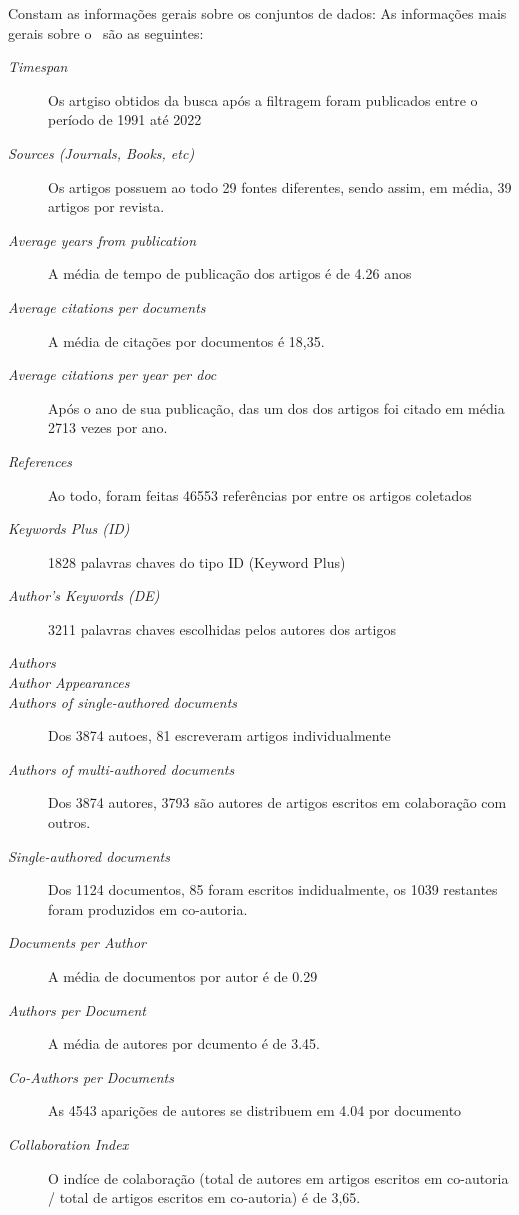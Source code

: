Constam as informações gerais sobre os conjuntos de dados:
As informações mais gerais sobre o \dataset\   são as seguintes:
\begin{description}
    \item [\textit{Timespan}] Os artgiso obtidos da busca após a filtragem foram publicados entre o período de 1991 até 2022
    \item [\textit{Sources (Journals, Books, etc)}] Os artigos possuem ao todo 29 fontes diferentes, sendo assim, em média, 39 artigos por revista.
    \item [\textit{Average years from publication}] A média de tempo de publicação dos artigos é de 4.26 anos
    \item [\textit{Average citations per documents}] A média de citações por documentos é 18,35.
    \item [\textit{Average citations per year per doc}] Após o ano de sua publicação, das um dos dos artigos foi citado em média 2713 vezes por ano.
    \item [\textit{References}] Ao todo, foram feitas 46553  referências por entre os artigos coletados
    \item [\textit{Keywords Plus (ID)}] 1828 palavras chaves do tipo ID (Keyword Plus)
    \item [\textit{Author's Keywords (DE)}]  3211 palavras chaves escolhidas pelos autores dos artigos

    \item [\textit{Authors}]  
    \item [\textit{Author Appearances}] 
    \item [\textit{Authors of single-authored documents}] Dos 3874 autoes, 81 escreveram artigos individualmente
    \item [\textit{Authors of multi-authored documents}] Dos 3874 autores, 3793 são autores de artigos escritos em colaboração com outros.
    \item [\textit{Single-authored documents}] Dos 1124 documentos, 85 foram escritos indidualmente, os 1039 restantes foram produzidos em co-autoria.
    \item [\textit{Documents per Author}] A média de documentos por autor é de 0.29
    \item [\textit{Authors per Document}] A média de autores por dcumento é de 3.45.
    \item [\textit{Co-Authors per Documents}] As 4543 aparições de autores se distribuem em 4.04 por documento
    \item [\textit{Collaboration Index}] O indíce de colaboração (total de autores em artigos escritos em co-autoria / total de artigos escritos em co-autoria) é de 3,65.
\end{description}
